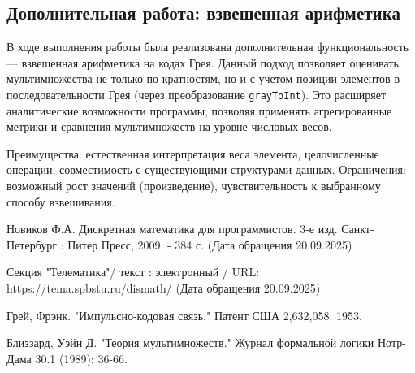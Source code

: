 \documentclass[12pt,a4paper]{article}
\begin{document}
\subsection{Дополнительная работа: взвешенная арифметика}

В ходе выполнения работы была реализована дополнительная функциональность — взвешенная арифметика на кодах Грея. Данный подход позволяет оценивать мультимножества не только по кратностям, но и с учетом позиции элементов в последовательности Грея (через преобразование \texttt{grayToInt}). Это расширяет аналитические возможности программы, позволяя применять агрегированные метрики и сравнения мультимножеств на уровне числовых весов.

Преимущества: естественная интерпретация веса элемента, целочисленные операции, совместимость с существующими структурами данных. Ограничения: возможный рост значений (произведение), чувствительность к выбранному способу взвешивания.

\newpage

\begin{thebibliography}{9}






 Новиков Ф.А. Дискретная математика для программистов. 3-е изд. Санкт-Петербург : Питер Пресс, 2009. - 384 с. (Дата обращения 20.09.2025)

 Секция "Телематика"/ текст : электронный / URL: https://tema.spbstu.ru/dismath/ (Дата обращения 20.09.2025)

 Грей, Фрэнк. "Импульсно-кодовая связь." Патент США 2,632,058. 1953.

 Близзард, Уэйн Д. "Теория мультимножеств." Журнал формальной логики Нотр-Дама 30.1 (1989): 36-66.




\end{thebibliography}
\end{document}
